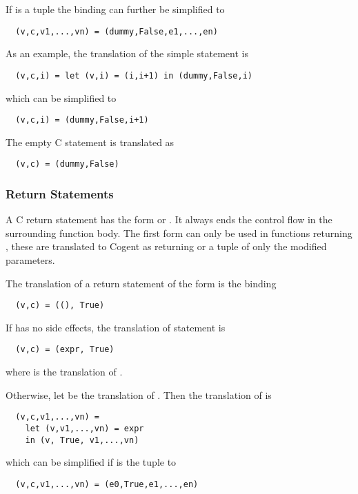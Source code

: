If  is a tuple 
 the binding can further be simplified to
\begin{verbatim}
  (v,c,v1,...,vn) = (dummy,False,e1,...,en)
\end{verbatim}

As an example, the translation of the simple statement  is
\begin{verbatim}
  (v,c,i) = let (v,i) = (i,i+1) in (dummy,False,i)
\end{verbatim}
which can be simplified to
\begin{verbatim}
  (v,c,i) = (dummy,False,i+1)
\end{verbatim}

The empty C statement \code{;} is translated as
\begin{verbatim}
  (v,c) = (dummy,False)
\end{verbatim}

\subsubsection{Return Statements}

A C return statement has the form  or . It always ends the control flow in the surrounding
function body. The first form can only be used in functions returning , these are translated to Cogent as returning 
\code{()} or a tuple of only the modified parameters. 

The translation of a return statement of the form  is the binding
\begin{verbatim}
  (v,c) = ((), True)
\end{verbatim}
If  has no
side effects, the translation of statement  is
\begin{verbatim}
  (v,c) = (expr, True)
\end{verbatim}
where  is
the translation of . 

Otherwise, let  be the translation of . Then 
the translation of  is
\begin{verbatim}
  (v,c,v1,...,vn) = 
    let (v,v1,...,vn) = expr
    in (v, True, v1,...,vn)
\end{verbatim}
which can be simplified if  is the tuple  to
\begin{verbatim}
  (v,c,v1,...,vn) = (e0,True,e1,...,en)
\end{verbatim}

